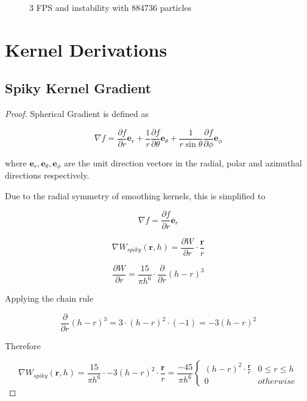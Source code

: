 \documentclass[12pt]{article}
\newcommand{\wideimage}[2][]{%
  \makebox[\textwidth][c]{\texttt{[image: \#2]}}%
}
\begin{document}
    \begin{figure}[H]
        \wideimage[height=0.4\textheight]{3Frames96Cubed.png}
        \caption{3 FPS and instability with 884736 particles}
    \end{figure}


    \section{Kernel Derivations}

    \subsection{Spiky Kernel Gradient}

    \begin{proof}
        Spherical Gradient is defined as

        $$\nabla f = \frac{\partial{f}}{\partial{r}}\textbf{e}_r + \frac{1}{r}\frac{\partial{f}}{\partial{\theta}}\textbf{e}_{\theta} + \frac{1}{r \sin{\theta}}\frac{\partial{f}}{\partial{\phi}}\textbf{e}_{\phi}$$
        
        where $\textbf{e}_{r}, \textbf{e}_{\theta}, \textbf{e}_{\phi}$ are the unit direction vectors in the radial, polar and azimuthal directions respectively.

        Due to the radial symmetry of smoothing kernels, this is simplified to

        $$\nabla f = \frac{\partial{f}}{\partial{r}}\textbf{e}_r$$

        $$\nabla W_{spiky}(\textbf{r}, h) = \frac{\partial{W}}{\partial{r}} \cdot \frac{\textbf{r}}{r}$$

        $$\frac{\partial{W}}{\partial{r}} = \frac{15}{\pi{h}^6} \cdot \frac{\partial}{\partial{r}} (h - r)^3$$

        Applying the chain rule

        $$\frac{\partial}{\partial{r}} (h - r)^3 = 3 \cdot (h - r)^2 \cdot (-1) = -3(h - r)^2$$

        Therefore

        $$\nabla{W_{spiky}(\textbf{r}, h)} = \frac{15}{\pi{h}^6} \cdot -3(h - r)^2 \cdot \frac{\textbf{r}}{r} = \frac{-45}{\pi{h}^6}\begin{cases}
            (h - r)^2 \cdot \frac{\textbf{r}}{r} & 0 \leq r \leq h \\
            0 & otherwise
        \end{cases}$$
    \end{proof}
\end{document}
